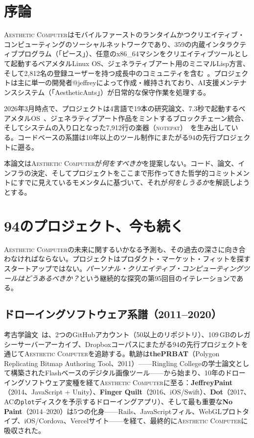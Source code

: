 \documentclass[10pt,letterpaper,twocolumn]{article}
\newcommand{\ac}{\textsc{Aesthetic Computer}}
\newcommand{\np}{\textsc{notepat}}
\begin{document}

\section{序論}

\ac{}はモバイルファーストのランタイムかつクリエイティブ・コンピューティングのソーシャルネットワークであり、359の内蔵インタラクティブプログラム（「ピース」）、任意のx86\_64マシンをクリエイティブツールとして起動するベアメタルLinux OS、ジェネラティブアート用のミニマルLisp方言、そして2,812名の登録ユーザーを持つ成長中のコミュニティを含む~\citep{scudder2026ac}。プロジェクトは主に単一の開発者@jeffreyによって作成・維持されており、AI支援メンテナンスシステム（「AestheticAnts」）が日常的な保守作業を処理する。

2026年3月時点で、プロジェクトは4言語で19本の研究論文、7.3秒で起動するベアメタルOS~\citep{scudder2026os}、ジェネラティブアート作品をミントするブロックチェーン統合、そしてシステムの入り口となった7,912行の楽器（\np{}）~\citep{scudder2026notepat}を生み出している。コードベースの系譜は10年以上のツール制作にまたがる94の先行プロジェクトに遡る。

本論文は\ac{}が\emph{何をすべきか}を提案しない。コード、論文、インフラの決定、そしてプロジェクトをここまで形作ってきた哲学的コミットメントにすでに見えているモメンタムに基づいて、それが\emph{何をしうるか}を解読しようとする。


\section{94のプロジェクト、今も続く}
\label{sec:history}

\ac{}の未来に関するいかなる予測も、その過去の深さに向き合わなければならない。プロジェクトはプロダクト・マーケット・フィットを探すスタートアップではない。\emph{パーソナル・クリエイティブ・コンピューティングツールはどうあるべきか？}という継続的な探究の第95回目のイテレーションである。

\subsection{ドローイングソフトウェア系譜（2011--2020）}

考古学論文~\citep{scudder2026archaeology}は、2つのGitHubアカウント（50以上のリポジトリ）、109\,GBのレガシーサーバーアーカイブ、Dropboxコーパスにまたがる94の先行プロジェクトを通じて\ac{}を追跡する。軌跡は\textbf{thePRBAT}（Polygon Replicating Bitmap Authoring Tool、2011）——Ringling Collegeの学士論文として構築されたFlashベースのデジタル画像ツール——から始まり、10年のドローイングソフトウェア変種を経て\ac{}に至る：\textbf{JeffreyPaint}（2014、JavaScript + Unity）、\textbf{Finger Quilt}（2016、iOS/Swift）、\textbf{Dot}（2017、ACの\texttt{plot}ディスクを予示するドローイングアプリ）、そして最も重要な\textbf{No Paint}（2014--2020）は5つの化身——Rails、JavaScriptフィル、WebGLプロトタイプ、iOS/Cordova、Vercelサイト——を経て、最終的に\ac{}に吸収された。
\end{document}
